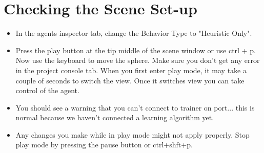 \documentclass[11pt,fleqn,openany]{book} %
\begin{document}
\section{Checking the Scene Set-up}
\begin{itemize}
    \item In the agents inspector tab, change the Behavior Type to "Heuristic Only".
    \item Press the play button at the tip middle of the scene window or use ctrl + p. Now use the keyboard to move the sphere. Make sure you don't get any error in the project console tab. When you first enter play mode, it may take a couple of seconds to switch the view. Once it switches view you can take control of the agent.
    \item You should see a warning that you can't connect to trainer on port... this is normal because we haven't connected a learning algorithm yet.
    \item  Any changes you make while in play mode might not apply properly. Stop play mode by pressing the pause button or ctrl+shft+p. 
\end{itemize}
\end{document}
